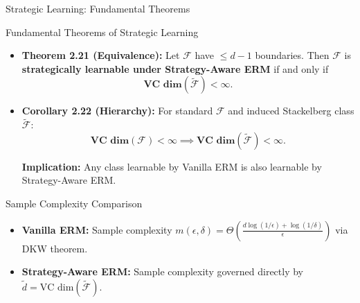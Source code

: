 \documentclass[aspectratio=169, 11pt, t, xcolor=table]{beamer}
\newcommand{\cg}[1]{\mathcal{#1}}
\newcommand{\eps}{\epsilon}
\newcommand{\dlt}{\delta}
\begin{document}
\begin{frame}{Strategic Learning: Fundamental Theorems}
\small
\begin{block}{Fundamental Theorems of Strategic Learning}
\footnotesize
\begin{itemize}\itemsep=1.5pt
  \item \textbf{Theorem 2.21 (Equivalence):} Let $\cg{F}$ have $\le d-1$ boundaries. Then $\cg{F}$ is \textbf{strategically learnable under Strategy-Aware ERM} if and only if
  \[
    \mathbf{\text{VC dim}(\widetilde{\cg{F}}) < \infty}.
  \]
  \item \textbf{Corollary 2.22 (Hierarchy):} For standard $\cg{F}$ and induced Stackelberg class $\widetilde{\cg{F}}$:
  \[
    \mathbf{\text{VC dim}(\cg{F}) < \infty \implies \text{VC dim}(\widetilde{\cg{F}}) < \infty}.
  \]
  \par{\scriptsize \textbf{Implication:} Any class learnable by Vanilla ERM is also learnable by Strategy-Aware ERM.}
\end{itemize}
\end{block}

\vspace{0.1em}
\begin{block}{Sample Complexity Comparison}
\footnotesize
\begin{itemize}\itemsep=1pt
  \item \textbf{Vanilla ERM:} Sample complexity $m(\eps, \dlt) = \Theta\left(\frac{d \log(1/\eps) + \log(1/\dlt)}{\eps}\right)$ via DKW theorem.
  \item \textbf{Strategy-Aware ERM:} Sample complexity governed directly by $\widetilde{d} = \text{VC dim}(\widetilde{\cg{F}})$.
\end{itemize}
\end{block}
\end{frame}
\end{document}
